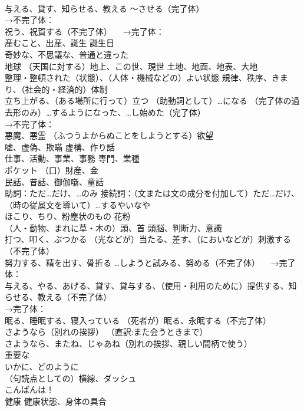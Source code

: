 \documentclass[8pt]{extreport}
\begin{document}
\begin{CJK}{UTF8}{min}
\\	与える、貸す、知らせる、教える 〜させる（完了体） 
\\	→不完了体：
\\	祝う、祝賀する（不完了体） 　→完了体：
\\	産むこと、出産、誕生 誕生日
\\	奇妙な、不思議な、普通と違った
\\	地球 （天国に対する）地上、この世、現世 土地、地面、地表、大地
\\	整理・整頓された（状態）、（人体・機械などの）よい状態 規律、秩序、きまり、（社会的・経済的）体制 
\\	立ち上がる、（ある場所に行って）立つ （助動詞として）…になる （完了体の過去形のみ）…するようになった、…し始めた（完了体） 
\\	→不完了体：
\\	悪魔、悪霊 （ふつうよからぬことをしようとする）欲望
\\	嘘、虚偽、欺瞞 虚構、作り話
\\	仕事、活動、事業、事務 専門、業種
\\	ポケット （口）財産、金
\\	民話、昔話、御伽噺、童話
\\	助詞：ただ…だけ、…のみ 接続詞：（文または文の成分を付加して）ただ…だけ、（時の従属文を導いて）…するやいなや
\\	ほこり、ちり、粉塵状のもの 花粉
\\	（人・動物、まれに草・木の）頭、首 頭脳、判断力、意識
\\	打つ、叩く、ぶつかる （光などが）当たる、差す、（においなどが）刺激する（不完了体） 
\\	努力する、精を出す、骨折る …しようと試みる、努める（不完了体） 　→完了体：
\\	与える、やる、あげる、貸す、貸与する、（使用・利用のために）提供する、知らせる、教える（不完了体） 
\\	→完了体：
\\	眠る、睡眠する、寝入っている （死者が）眠る、永眠する（不完了体）
\\	さようなら（別れの挨拶） （直訳:また会うときまで）
\\	さようなら、またね、じゃあね（別れの挨拶、親しい間柄で使う）
\\	重要な
\\	いかに、どのように
\\	（句読点としての）横線、ダッシュ
\\	こんばんは！
\\	健康 健康状態、身体の具合

\end{CJK}
\end{document}
